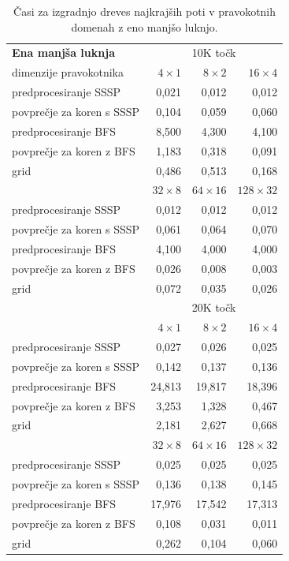 \documentclass[a4paper, 12pt]{book}
\begin{document}
\begin{table}[htp]
\begin{center}
\begin{tabular}{l*{3}{r}}
\textbf{Ena manjša luknja} & \multicolumn{3}{c}{10K točk}\\						
dimenzije pravokotnika	&	$4\times 1$	&	$8\times 2$	&	$16\times 4$		\\
\hline
predprocesiranje SSSP	&	0,021	&	0,012	&	0,012		\\
povprečje za koren s SSSP	&	0,104	&	0,059	&	0,060		\\
predprocesiranje BFS	&	8,500	&	4,300	&	4,100		\\
povprečje za koren z BFS	&	1,183	&	0,318	&	0,091		\\
grid	&	0,486	&	0,513	&	0,168  \vspace{.2cm}	\\
&	$32\times 8$	&	$64\times 16$	&	$128\times 32$ \\
predprocesiranje SSSP &	0,012	&	0,012	&	0,012 \\
povprečje za koren s SSSP &	0,061	&	0,064	&	0,070 \\
predprocesiranje BFS &	4,100	&	4,000	&	4,000 \\
povprečje za koren z BFS &	0,026	&	0,008	&	0,003 \\
grid &	0,072	&	0,035	&	0,026\vspace{.2cm} \\
\hline
  & \multicolumn{3}{c}{20K točk}\\
  &	$4\times 1$	&	$8\times 2$	&	$16\times 4$		\\  			
\hline
predprocesiranje SSSP	&	0,027	&	0,026	&	0,025	\\
povprečje za koren s SSSP	&	0,142	&	0,137	&	0,136	\\
predprocesiranje BFS	&	24,813	&	19,817	&	18,396	\\
povprečje za koren z BFS	&	3,253	&	1,328	&	0,467	\\
grid				&	2,181	&	2,627	&	0,668	\\
&	$32\times 8$	&	$64\times 16$	&	$128\times 32$ \\
predprocesiranje SSSP &	0,025	&	0,025	&	0,025	\\
povprečje za koren s SSSP &	0,136	&	0,138	&	0,145	\\
predprocesiranje BFS &	17,976	&	17,542	&	17,313	\\
povprečje za koren z BFS &	0,108	&	0,031	&	0,011	\\
grid &	0,262	&	0,104	&	0,060 
\end{tabular}
\caption{Časi za izgradnjo dreves najkrajših poti v pravokotnih domenah z eno manjšo luknjo.}
\label{table2}
\end{center}
\end{table}
\end{document}

